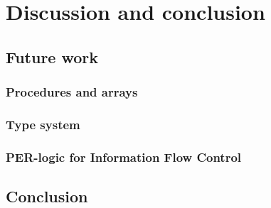\section{Discussion and conclusion}

\subsection{Future work}

\subsubsection{Procedures and arrays}

\subsubsection{Type system}

\subsubsection{PER-logic for Information Flow Control}

\subsection{Conclusion}
